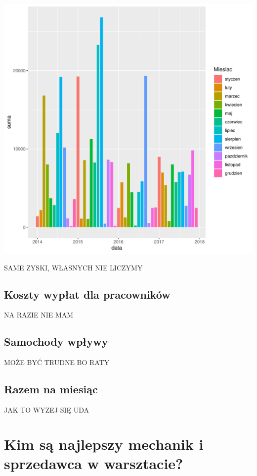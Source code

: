 \documentclass{article}\usepackage[]{graphicx}\usepackage[]{xcolor}
\makeatletter
\def\maxwidth{ %
  \ifdim\Gin@nat@width>\linewidth
    \linewidth
  \else
    \Gin@nat@width
  \fi
}
\newenvironment{knitrout}{}{} %
\makeatother
\begin{document}
\begin{knitrout}
\color{fgcolor}
\includegraphics[width=\maxwidth]{figure/unnamed-chunk-8-1} 
\end{knitrout}

{\color{red} SAME ZYSKI, WŁASNYCH NIE LICZYMY}

\subsection{Koszty wypłat dla pracowników}

{\color{red} NA RAZIE NIE MAM}

\subsection{Samochody wpływy}

{\color{red} MOŻE BYĆ TRUDNE BO RATY}

\subsection{Razem na miesiąc}

{\color{red} JAK TO WYZEJ SIĘ UDA}


\section{Kim są najlepszy mechanik i sprzedawca w warsztacie?}
\end{document}
